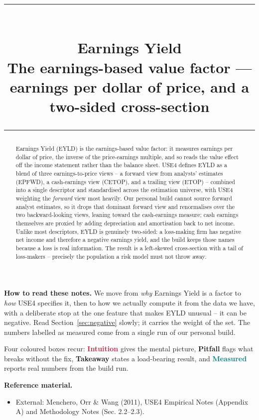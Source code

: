 \documentclass[11pt]{article}
\title{\vspace{-2.2em}
  {\color{steel}\rule{\textwidth}{1.3pt}}\\[0.7em]
  \Huge\bfseries Earnings Yield\\[0.35em]
  \large\mdseries The earnings-based value factor --- earnings per dollar of price, and a two-sided cross-section\\[0.4em]
  {\color{steel}\rule{\textwidth}{0.7pt}}}
\author{}
\date{}
\theoremstyle{definition}
\theoremstyle{plain}
\theoremstyle{remark}
\begin{document}
\maketitle
\thispagestyle{empty}

\begin{abstract}
Earnings Yield (EYLD) is the earnings-based value factor: it measures earnings per dollar of price, the inverse of the price-earnings multiple, and so reads the value effect off the income statement rather than the balance sheet. USE4 defines EYLD as a blend of three earnings-to-price views -- a forward view from analysts' estimates (EPFWD), a cash-earnings view (CETOP), and a trailing view (ETOP) -- combined into a single descriptor and standardised across the estimation universe, with USE4 weighting the \emph{forward} view most heavily. Our personal build cannot source forward analyst estimates, so it drops that dominant forward view and renormalises over the two backward-looking views, leaning toward the cash-earnings measure; cash earnings themselves are proxied by adding depreciation and amortisation back to net income. Unlike most descriptors, EYLD is genuinely two-sided: a loss-making firm has negative net income and therefore a negative earnings yield, and the build keeps those names because a loss is real information. The result is a left-skewed cross-section with a tail of loss-makers -- precisely the population a risk model must not throw away.
\end{abstract}

\begin{tcolorbox}[colback=paperlt,colframe=ink!30,boxrule=0.4pt,arc=2pt,left=10pt,right=10pt,top=8pt,bottom=8pt]
\textbf{How to read these notes.} We move from \emph{why} Earnings Yield is a factor to \emph{how} USE4 specifies it, then to how we actually compute it from the data we have, with a deliberate stop at the one feature that makes EYLD unusual -- it can be negative. Read Section~\ref{sec:negative} slowly; it carries the weight of the set. The numbers labelled as measured come from a single run of our personal build.

\smallskip
Four coloured boxes recur: \textcolor{crimson}{\textbf{Intuition}} gives the mental picture, \textcolor{amber}{\textbf{Pitfall}} flags what breaks without the fix, \textcolor{steel}{\textbf{Takeaway}} states a load-bearing result, and \textcolor{teal}{\textbf{Measured}} reports real numbers from the build run.

\smallskip
\textbf{Reference material.}
\begin{itemize}[leftmargin=1.4em,topsep=2pt]
  \item External: Menchero, Orr \& Wang (2011), USE4 Empirical Notes (Appendix A) and Methodology Notes (Sec. 2.2--2.3).
\end{itemize}
\end{tcolorbox}
\end{document}
